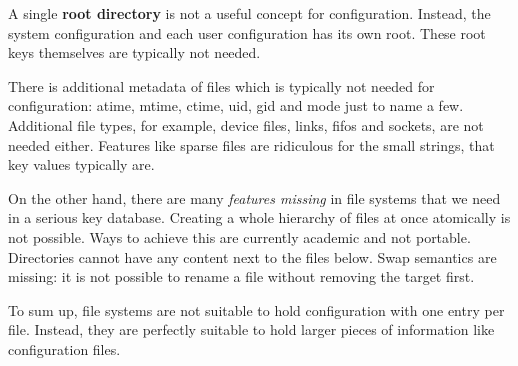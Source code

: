 A single {\bfseries root directory} is not a useful concept for configuration. Instead, the system configuration and each user configuration has its own root. These root keys themselves are typically not needed.

There is additional metadata of files which is typically not needed for configuration\+: atime, mtime, ctime, uid, gid and mode just to name a few. Additional file types, for example, device files, links, fifos and sockets, are not needed either. Features like sparse files are ridiculous for the small strings, that key values typically are.

On the other hand, there are many {\itshape features missing} in file systems that we need in a serious key database. Creating a whole hierarchy of files at once atomically is not possible. Ways to achieve this are currently academic and not portable. Directories cannot have any content next to the files below. Swap semantics are missing\+: it is not possible to rename a file without removing the target first.

To sum up, file systems are not suitable to hold configuration with one entry per file. Instead, they are perfectly suitable to hold larger pieces of information like configuration files. 